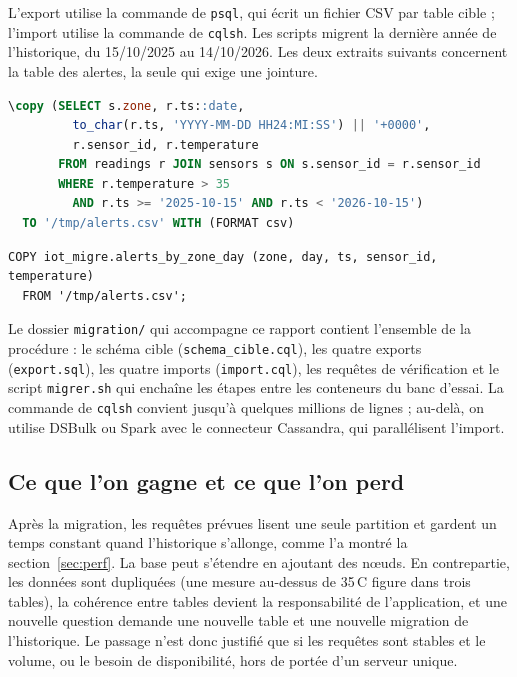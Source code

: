 \documentclass[11pt,a4paper]{article}
\newcommand{\cq}[1]{\texttt{\detokenize{#1}}}
\begin{document}
L'export utilise la commande \cq{\copy} de \texttt{psql}, qui écrit un fichier CSV par table cible ; l'import utilise la commande \cq{COPY} de \texttt{cqlsh}. Les scripts migrent la dernière année de l'historique, du 15/10/2025 au 14/10/2026. Les deux extraits suivants concernent la table des alertes, la seule qui exige une jointure.

\begin{lstlisting}[language=SQL,caption={Export depuis PostgreSQL : la jointure est faite une fois, à l'export}]
\copy (SELECT s.zone, r.ts::date,
         to_char(r.ts, 'YYYY-MM-DD HH24:MI:SS') || '+0000',
         r.sensor_id, r.temperature
       FROM readings r JOIN sensors s ON s.sensor_id = r.sensor_id
       WHERE r.temperature > 35
         AND r.ts >= '2025-10-15' AND r.ts < '2026-10-15')
  TO '/tmp/alerts.csv' WITH (FORMAT csv)
\end{lstlisting}

\begin{lstlisting}[language=CQL,caption={Import dans Cassandra}]
COPY iot_migre.alerts_by_zone_day (zone, day, ts, sensor_id, temperature)
  FROM '/tmp/alerts.csv';
\end{lstlisting}

Le dossier \texttt{migration/} qui accompagne ce rapport contient l'ensemble de la procédure : le schéma cible (\texttt{schema\_cible.cql}), les quatre exports (\texttt{export.sql}), les quatre imports (\texttt{import.cql}), les requêtes de vérification et le script \texttt{migrer.sh} qui enchaîne les étapes entre les conteneurs du banc d'essai. La commande \cq{COPY} de \texttt{cqlsh} convient jusqu'à quelques millions de lignes ; au-delà, on utilise DSBulk ou Spark avec le connecteur Cassandra, qui parallélisent l'import.

\subsection{Ce que l'on gagne et ce que l'on perd}
Après la migration, les requêtes prévues lisent une seule partition et gardent un temps constant quand l'historique s'allonge, comme l'a montré la section~\ref{sec:perf}. La base peut s'étendre en ajoutant des nœuds. En contrepartie, les données sont dupliquées (une mesure au-dessus de 35\,\textdegree C figure dans trois tables), la cohérence entre tables devient la responsabilité de l'application, et une nouvelle question demande une nouvelle table et une nouvelle migration de l'historique. Le passage n'est donc justifié que si les requêtes sont stables et le volume, ou le besoin de disponibilité, hors de portée d'un serveur unique.
\end{document}
